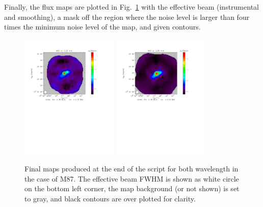 \documentclass[a4paper]{article}
\begin{document}
Finally, the flux maps are plotted in Fig.~\ref{fig:M87_nice_map} with the effective beam (instrumental and smoothing), a mask off the region where the noise level is larger than four times the minimum noise level of the map, and given contours.
\begin{figure}
\centering
\includegraphics[height=6.0cm, trim=1cm 13cm 4cm 1cm, clip=true]{Figure/M87_1mm}
\includegraphics[height=6.0cm, trim=1cm 13cm 4cm 1cm, clip=true]{Figure/M87_2mm}
\caption{Final maps produced at the end of the script for both wavelength in the case of M87. The effective beam FWHM is shown as white circle on the bottom left corner, the map background (or not shown) is set to gray, and black contours are over plotted for clarity.}
\label{fig:M87_nice_map}
\end{figure}

\end{document}
